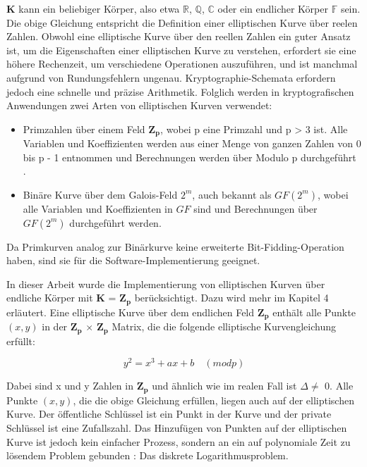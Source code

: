$ \mathbf{K} $ kann ein beliebiger Körper, also etwa $ \mathbb{R} $, $ \mathbb{Q} $, $ \mathbb{C} $ oder ein endlicher Körper $ \mathbb{F} $ sein\cite{werner}. Die obige Gleichung entspricht die Definition einer elliptischen Kurve über reelen Zahlen.
Obwohl eine elliptische Kurve über den reellen Zahlen ein guter Ansatz ist, um die Eigenschaften einer elliptischen Kurve zu verstehen, erfordert sie eine höhere Rechenzeit, um verschiedene Operationen auszuführen, und ist manchmal aufgrund von Rundungsfehlern ungenau. Kryptographie-Schemata erfordern jedoch eine schnelle und präzise Arithmetik\cite{razad}. Folglich werden in kryptografischen Anwendungen zwei Arten von elliptischen Kurven verwendet:
	\begin{itemize}
	    \item Primzahlen über einem Feld $ \mathbf{Z_p} $, wobei p eine Primzahl und p > 3 ist. Alle Variablen und Koeffizienten werden aus einer Menge von ganzen Zahlen von 0 bis p - 1 entnommen und Berechnungen werden über Modulo p durchgeführt \cite{werner}.
        \item 	Binäre Kurve über dem Galois-Feld $ 2^m $, auch bekannt als $ GF(2^m) $, wobei alle Variablen und Koeffizienten in $ GF $ sind und Berechnungen über $ GF(2^m) $ durchgeführt werden.
	\end{itemize}

Da Primkurven analog zur Binärkurve keine erweiterte Bit-Fidding-Operation haben, sind sie für die Software-Implementierung geeignet\cite{razad}.



In dieser Arbeit wurde die Implementierung von elliptischen Kurven über endliche Körper mit $ \mathbf{K} $ = $ \mathbf{Z_p} $ berücksichtigt. Dazu wird mehr im Kapitel 4 erläutert.
Eine elliptische Kurve über dem endlichen Feld $ \mathbf{Z_p} $ enthält alle Punkte $ (x, y) $ in der $ \mathbf{Z_p} $ $ \times $ $ \mathbf{Z_p} $ Matrix, die die folgende elliptische Kurvengleichung erfüllt: 

\begin{ceqn}

\begin{equation}
     y^2 = x^3 + ax + b  \quad (mod p)
     \label{curve}
\end{equation}

\end{ceqn}

Dabei sind x und y Zahlen in $ \mathbf{Z_p} $  und ähnlich wie im realen Fall ist $ \Delta \neq $ 0.
Alle Punkte $ (x, y) $, die die obige Gleichung  erfüllen, liegen auch auf der elliptischen Kurve. Der öffentliche Schlüssel ist ein Punkt in der Kurve und der private Schlüssel ist eine Zufallszahl. Das Hinzufügen von Punkten auf der elliptischen Kurve ist jedoch kein einfacher Prozess, sondern an ein auf polynomiale Zeit zu lösendem Problem gebunden \cite{mo2014}: Das diskrete Logarithmusproblem. 


